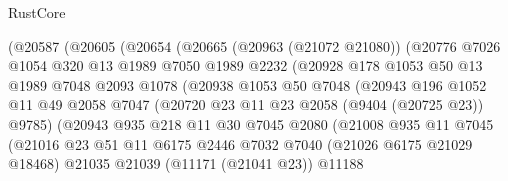 \begin{lexlean}{RustCore}
\begin{coremodule}
                      (@20587
                        (@20605
                          (@20654
                            (@20665
                              (@20963 (@21072 @21080))
                              (@20776
                                @7026
                                @1054
                                @320
                                @13
                                @1989
                                @7050
                                @1989
                                @2232
                                (@20928
                                  @178
                                  @1053
                                  @50
                                  @13
                                  @1989
                                  @7048
                                  @2093
                                  @1078
                                  (@20938
                                    @1053
                                    @50
                                    @7048
                                    (@20943
                                      @196
                                      @1052
                                      @11
                                      @49
                                      @2058
                                      @7047
                                      (@20720 @23 @11 @23 @2058 (@9404 (@20725 @23)) @9785)
                                      (@20943
                                        @935
                                        @218
                                        @11
                                        @30
                                        @7045
                                        @2080
                                        (@21008
                                          @935
                                          @11
                                          @7045
                                          (@21016
                                            @23
                                            @51
                                            @11
                                            @6175
                                            @2446
                                            @7032
                                            @7040
                                            (@21026 @6175 @21029 @18468)
                                            @21035
                                            @21039
                                            (@11171 (@21041 @23))
                                            @11188

\end{coremodule}
\end{lexlean}
